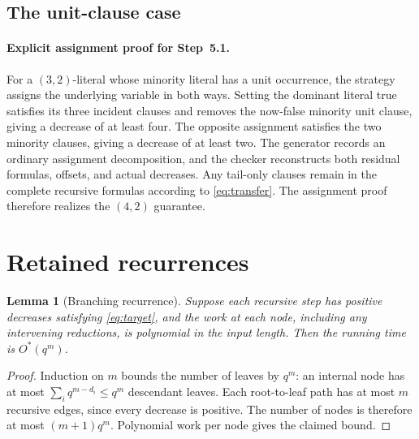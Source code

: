 \documentclass[10pt,twoside]{article}
\newcommand{\OhStar}{O^*}
\newtheorem{lemma}[theorem]{Lemma}
\theoremstyle{definition}
\theoremstyle{remark}
\begin{document}
\subsection{The unit-clause case}
\label{sec:strategies}

\paragraph{Explicit assignment proof for Step~5.1.}
For a $(3,2)$-literal whose minority literal has a unit occurrence, the
strategy assigns the underlying variable in both ways. Setting the dominant
literal true satisfies its three incident clauses and removes the now-false
minority unit clause, giving a decrease of at least four. The opposite
assignment satisfies the two minority clauses, giving a decrease of at least
two. The generator records an ordinary assignment decomposition, and the
checker reconstructs both residual formulas, offsets, and actual decreases.
Any tail-only clauses remain in the complete recursive formulas according to
\cref{eq:transfer}. The assignment proof therefore realizes the $(4,2)$
guarantee.

\section{Retained recurrences}
\label{app:recurrences}

\begin{lemma}[Branching recurrence]
\label{lem:recurrence}
Suppose each recursive step has positive decreases satisfying
\cref{eq:target}, and the work at each node, including any intervening
reductions, is polynomial in the input length. Then the running time is
$\OhStar(q^m)$.
\end{lemma}
\begin{proof}
Induction on $m$ bounds the number of leaves by $q^m$: an internal node has
at most $\sum_i q^{m-d_i}\le q^m$ descendant leaves. Each root-to-leaf path
has at most $m$ recursive edges, since every decrease is positive. The number
of nodes is therefore at most $(m+1)q^m$. Polynomial work per node gives
the claimed bound.
\end{proof}
\end{document}
